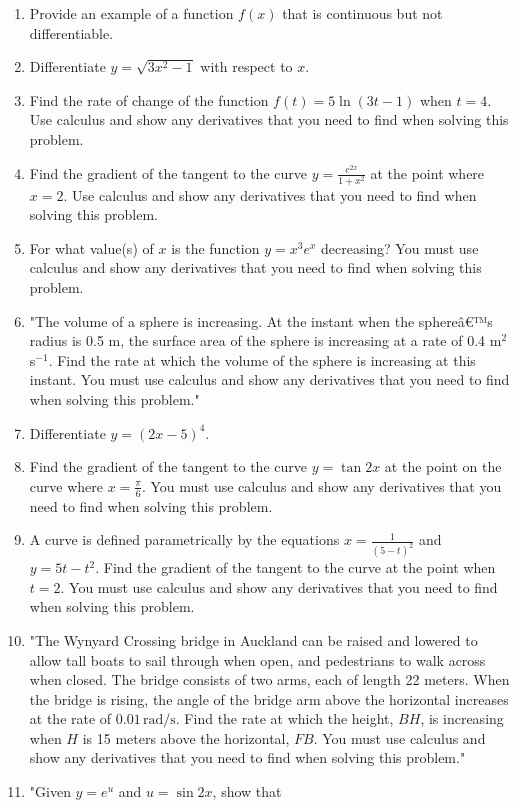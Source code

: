 \documentclass{article}
\begin{document}
\begin{enumerate}
\vspace{3cm}
\item Provide an example of a function \( f(x) \) that is continuous but not differentiable.
\vspace{3cm}
\item Differentiate \( y = \sqrt{3x^2 - 1} \) with respect to \( x \).
\vspace{3cm}
\item Find the rate of change of the function \( f(t) = 5 \ln(3t - 1) \) when \( t = 4 \). Use calculus and show any derivatives that you need to find when solving this problem.
\vspace{3cm}
\item Find the gradient of the tangent to the curve \( y = \frac{e^{2x}}{1 + x^2} \) at the point where \( x = 2 \). Use calculus and show any derivatives that you need to find when solving this problem.
\vspace{3cm}
\item For what value(s) of \( x \) is the function \( y = x^3 e^x \) decreasing? You must use calculus and show any derivatives that you need to find when solving this problem.
\vspace{3cm}
\item "The volume of a sphere is increasing. At the instant when the sphereâ€™s radius is 0.5 m, the surface area of the sphere is increasing at a rate of 0.4 m\(^2\) s\(^{-1}\). Find the rate at which the volume of the sphere is increasing at this instant. You must use calculus and show any derivatives that you need to find when solving this problem."
\vspace{3cm}
\item Differentiate \( y = (2x - 5)^4 \).
\vspace{3cm}
\item Find the gradient of the tangent to the curve \( y = \tan 2x \) at the point on the curve where \( x = \frac{\pi}{6} \). You must use calculus and show any derivatives that you need to find when solving this problem.
\vspace{3cm}
\item A curve is defined parametrically by the equations \( x = \frac{1}{(5-t)^2} \) and \( y = 5t - t^2 \). Find the gradient of the tangent to the curve at the point when \( t = 2 \). You must use calculus and show any derivatives that you need to find when solving this problem.
\vspace{3cm}
\item "The Wynyard Crossing bridge in Auckland can be raised and lowered to allow tall boats to sail through when open, and pedestrians to walk across when closed. The bridge consists of two arms, each of length 22 meters. When the bridge is rising, the angle of the bridge arm above the horizontal increases at the rate of \(0.01 \, \text{rad/s}\). Find the rate at which the height, \(BH\), is increasing when \(H\) is 15 meters above the horizontal, \(FB\). You must use calculus and show any derivatives that you need to find when solving this problem."
\vspace{3cm}
\item "Given \( y = e^u \) and \( u = \sin 2x \), show that


\end{enumerate}
\end{document}

